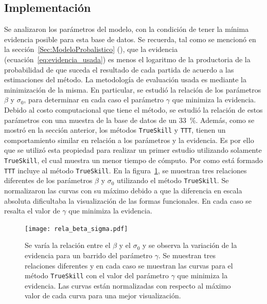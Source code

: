 \documentclass[11pt,twoside,spanish]{report} %
\begin{document}
\subsection{Implementaci\'on}

Se analizaron los par\'ametros del modelo, con la condici\'on de tener la m\'inima evidencia posible para esta base de datos.
Se recuerda, tal como se mencion\'o en la secci\'on~\ref{Sec:ModeloProbalistico} (), que la evidencia (ecuaci\'on~\ref{eq:evidencia_usada}) es menos el logaritmo de la productoria de la probabilidad de que suceda el resultado de cada partida de acuerdo a las estimaciones del m\'etodo. 
La metodolog\'ia de evaluaci\'on usada es mediante la minimizaci\'on de la misma.
En particular, se estudi\'o la relaci\'on de los par\'ametros $\beta$ y $\sigma_0$, para determinar en cada caso el par\'ametro $\gamma$ que minimiza la evidencia.
Debido al costo computacional que tiene el m\'etodo, se estudi\'o la relaci\'on de estos par\'ametros con una muestra de la base de datos de un \SI{33}{\percent}.
Adem\'as, como se mostr\'o en la secci\'on anterior, los m\'etodos \texttt{TrueSkill} y \texttt{TTT}, tienen un comportamiento similar en relaci\'on a los par\'ametros y la evidencia.
Es por ello que se utiliz\'o esta propiedad para realizar un primer estudio utilizando solamente \texttt{TrueSkill}, el cual muestra un menor tiempo de c\'omputo.
Por como est\'a formado \texttt{TTT} incluye al m\'etodo \texttt{TrueSkill}.
En la figura~\ref{fig:relaBetaSigma}, se muestran tres relaciones diferentes de los par\'ametros $\beta$ y $\sigma_0$ utilizando el m\'etodo \texttt{TrueSkill}.
Se normalizaron las curvas con su m\'aximo debido a que la diferencia en escala absoluta dificultaba la visualizaci\'on de las formas funcionales.
En cada caso se resalta el valor de $\gamma$ que minimiza la evidencia.




\begin{figure}[H]
	\centering
	\texttt{[image: rela\_beta\_sigma.pdf]}
	\caption{Se var\'ia la relaci\'on entre el $\beta$ y el $\sigma_0$ y se observa la variaci\'on de la evidencia para un barrido del par\'ametro $\gamma$. Se muestran tres relaciones diferentes y en cada caso se muestran las curvas para el m\'etodo \texttt{TrueSkill} con el valor del par\'ametro $\gamma$ que  minimiza la evidencia. Las curvas est\'an normalizadas con respecto al m\'aximo valor de cada curva para una mejor visualizaci\'on.}
	\label{fig:relaBetaSigma}
\end{figure}
\end{document}
